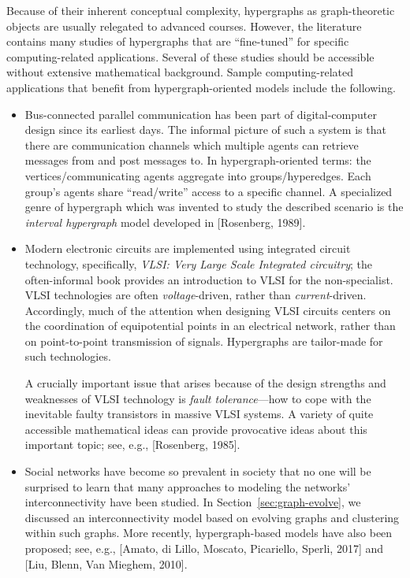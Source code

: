Because of their inherent conceptual complexity, hypergraphs as graph-theoretic objects are usually relegated to advanced courses.  However, the literature contains many studies of hypergraphs that are ``fine-tuned'' for specific computing-related applications.  Several of these studies should be accessible without extensive mathematical background.  Sample  computing-related applications that benefit from hypergraph-oriented models include the following.
\begin{itemize}
\item
Bus-connected parallel communication has been part of digital-computer design since its earliest days.  The informal picture of such a system is that there are communication channels which multiple agents can retrieve messages from and post messages to.  In hypergraph-oriented terms: the vertices/communicating agents aggregate into groups/hyperedges.  Each group's agents share ``read/write'' access to a specific channel.  A specialized genre of hypergraph which was invented to study the described scenario is the {\it interval hypergraph} model developed in [Rosenberg, 1989].

\medskip
\item
Modern electronic circuits are implemented using integrated circuit technology, specifically, {\em VLSI: Very Large Scale Integrated circuitry}; the often-informal book \cite{Mead-Conway} provides an introduction to VLSI for the non-specialist.  VLSI technologies are often {\em voltage}-driven, rather than {\em current}-driven.  Accordingly, much of the attention when designing VLSI circuits centers on the coordination of equipotential points in an electrical  network, rather than on point-to-point transmission of signals.  Hypergraphs are tailor-made for such technologies.

A crucially important issue that arises because of the design strengths and weaknesses of VLSI 
technology is {\it fault tolerance}---how to cope with the inevitable faulty transistors in massive VLSI systems.  A variety of quite accessible mathematical ideas can provide provocative ideas about this important topic; see, e.g., [Rosenberg, 1985].

 

\medskip
\item
Social networks have become so prevalent in society that no one will be surprised to learn that many approaches to modeling the networks' interconnectivity have been studied.  In
Section~\ref{sec:graph-evolve}, we discussed an interconnectivity model based on evolving graphs and clustering within such graphs.  More recently, hypergraph-based models have also been proposed; see, e.g., [Amato, di Lillo, Moscato, Picariello, Sperli, 2017] and [Liu, Blenn, Van Mieghem, 2010].
\end{itemize}

